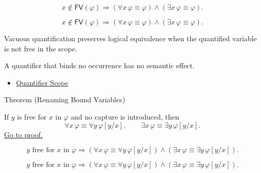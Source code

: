 \begin{remark*}
\[
x\notin\mathsf{FV}(\varphi)
\Rightarrow
(\forall x\,\varphi\equiv\varphi)
\land
(\exists x\,\varphi\equiv\varphi).
\]
\end{remark*}

\begin{remark*}
\[
x\notin\mathsf{FV}(\varphi)
\Rightarrow
(\forall x\,\varphi\equiv\varphi)
\land
(\exists x\,\varphi\equiv\varphi).
\]
\end{remark*}



\begin{remark*}[Interpretation]
Vacuous quantification preserves logical equivalence when the quantified
variable is not free in the scope.

A quantifier that binds no occurrence has no semantic effect.
\end{remark*}

\begin{dependencies}
\begin{itemize}
  \item \hyperref[def:quantifier-scope]{Quantifier Scope}
\end{itemize}
\end{dependencies}

\begin{theorembox}{Theorem (Renaming Bound Variables)}
\begin{theorem}
\label{thm:rename}
If \(y\) is free for \(x\) in \(\varphi\) and no capture is introduced, then
\[
\forall x\,\varphi\equiv\forall y\,\varphi[y/x],
\qquad
\exists x\,\varphi\equiv\exists y\,\varphi[y/x].
\]
\hyperref[prf:rename]{Go to proof.}
\end{theorem}
\end{theorembox}

\begin{remark*}
\[
y \text{ free for } x \text{ in } \varphi
\Rightarrow
(\forall x\,\varphi\equiv\forall y\,\varphi[y/x])
\land
(\exists x\,\varphi\equiv\exists y\,\varphi[y/x]).
\]
\end{remark*}

\begin{remark*}
\[
y \text{ free for } x \text{ in } \varphi
\Rightarrow
(\forall x\,\varphi\equiv\forall y\,\varphi[y/x])
\land
(\exists x\,\varphi\equiv\exists y\,\varphi[y/x]).
\]
\end{remark*}




